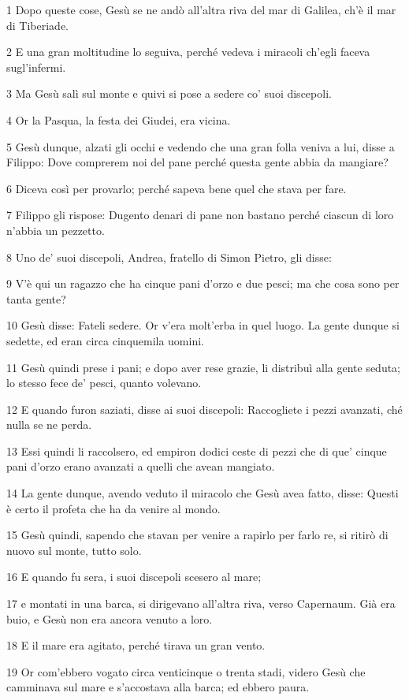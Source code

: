 \par 1 Dopo queste cose, Gesù se ne andò all'altra riva del mar di Galilea, ch'è il mar di Tiberiade.
\par 2 E una gran moltitudine lo seguiva, perché vedeva i miracoli ch'egli faceva sugl'infermi.
\par 3 Ma Gesù salì sul monte e quivi si pose a sedere co' suoi discepoli.
\par 4 Or la Pasqua, la festa dei Giudei, era vicina.
\par 5 Gesù dunque, alzati gli occhi e vedendo che una gran folla veniva a lui, disse a Filippo: Dove comprerem noi del pane perché questa gente abbia da mangiare?
\par 6 Diceva così per provarlo; perché sapeva bene quel che stava per fare.
\par 7 Filippo gli rispose: Dugento denari di pane non bastano perché ciascun di loro n'abbia un pezzetto.
\par 8 Uno de' suoi discepoli, Andrea, fratello di Simon Pietro, gli disse:
\par 9 V'è qui un ragazzo che ha cinque pani d'orzo e due pesci; ma che cosa sono per tanta gente?
\par 10 Gesù disse: Fateli sedere. Or v'era molt'erba in quel luogo. La gente dunque si sedette, ed eran circa cinquemila uomini.
\par 11 Gesù quindi prese i pani; e dopo aver rese grazie, li distribuì alla gente seduta; lo stesso fece de' pesci, quanto volevano.
\par 12 E quando furon saziati, disse ai suoi discepoli: Raccogliete i pezzi avanzati, ché nulla se ne perda.
\par 13 Essi quindi li raccolsero, ed empiron dodici ceste di pezzi che di que' cinque pani d'orzo erano avanzati a quelli che avean mangiato.
\par 14 La gente dunque, avendo veduto il miracolo che Gesù avea fatto, disse: Questi è certo il profeta che ha da venire al mondo.
\par 15 Gesù quindi, sapendo che stavan per venire a rapirlo per farlo re, si ritirò di nuovo sul monte, tutto solo.
\par 16 E quando fu sera, i suoi discepoli scesero al mare;
\par 17 e montati in una barca, si dirigevano all'altra riva, verso Capernaum. Già era buio, e Gesù non era ancora venuto a loro.
\par 18 E il mare era agitato, perché tirava un gran vento.
\par 19 Or com'ebbero vogato circa venticinque o trenta stadi, videro Gesù che camminava sul mare e s'accostava alla barca; ed ebbero paura.
